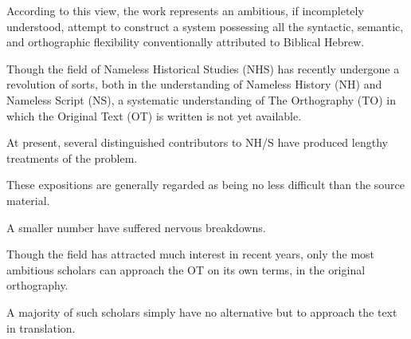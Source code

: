 {{\begin{together}
{{        According to this view, the work represents an ambitious, if incompletely understood,
            attempt to construct a system possessing all the syntactic, semantic,
            and orthographic flexibility conventionally attributed to Biblical Hebrew.

        Though the field of Nameless Historical Studies (NHS) has recently undergone a revolution of sorts,
            both in the understanding of Nameless History (NH) and Nameless Script (NS),
            a systematic understanding of The Orthography (TO) in which the Original Text (OT)
            is written is not yet available.

        At present, several distinguished contributors to NH/S have produced lengthy treatments of the problem.

        These expositions are generally regarded as being no less difficult than the source material.

        A smaller number have suffered nervous breakdowns.

        Though the field has attracted much interest in recent years, only the most ambitious
            scholars can approach the OT on its own terms, in the original orthography.

        A majority of such scholars simply have no alternative but to approach the text in translation.
	    }}

    \end{together}

}

}

{
}
{
}
{
}

{
}
{
}
{
}

{
}
{
}
{
}

